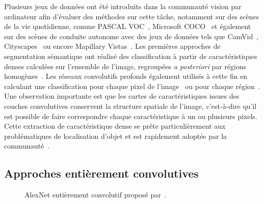 Plusieurs jeux de données ont été introduits dans la communauté vision par ordinateur afin d'évaluer des méthodes sur cette tâche, notamment sur des scènes de la vie quotidienne, comme PASCAL VOC~\cite{everingham_pascal_2014}, Microsoft COCO~\cite{lin_microsoft_2014} et également sur des scènes de conduite autonome avec des jeux de données tels que CamVid~\cite{brostow_semantic_2009}, Cityscapes~\cite{cordts_cityscapes_2016} ou encore Mapillary Vistas~\cite{neuhold_mapillary_2017}. Les premières approches de segmentation sémantique ont réalisé des classification à partir de caractéristiques denses calculées sur l'ensemble de l'image, regroupées \emph{a posteriori} par régions homogènes~\cite{shotton_semantic_2008,shotton_real-time_2011}. Les réseaux convolutifs profonds également utilisés à cette fin en calculant une classification pour chaque pixel de l'image~\cite{grangier_deep_2009,ciresan_deep_2012} ou pour chaque région~\cite{farabet_towards_2013,sermanet_overfeat_2013}. Une observation importante est que les cartes de caractéristiques issues des couches convolutives conservent la structure spatiale de l'image, c'est-à-dire qu'il est possible de faire correspondre chaque caractéristique à un ou plusieurs pixels. Cette extraction de caractéristique dense se prête particulièrement aux problématiques de localisation d'objet et est rapidement adoptée par la communauté~\cite{zou_generic_2014}.

\subsection{Approches entièrement convolutives}

\begin{figure}
  \resizebox{\textwidth}{!}{%
  
  }
  \caption{AlexNet entièrement convolutif proposé par~\citet{long_fully_2015}.}
\end{figure}


